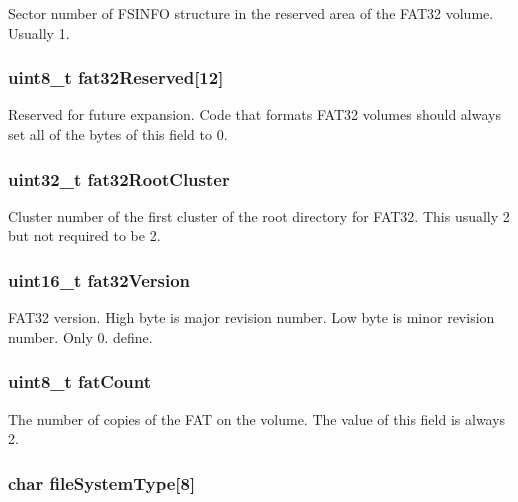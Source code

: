 Sector number of F\-S\-I\-N\-F\-O structure in the reserved area of the F\-A\-T32 volume. Usually 1. \hypertarget{structfat32__boot_ae31dc7ad96aec8e0d184fd7e5a97f30d}{
\subsubsection[{fat32\-Reserved}]{\setlength{\rightskip}{0pt plus 5cm}uint8\-\_\-t fat32\-Reserved\mbox{[}12\mbox{]}}}\label{structfat32__boot_ae31dc7ad96aec8e0d184fd7e5a97f30d}
Reserved for future expansion. Code that formats F\-A\-T32 volumes should always set all of the bytes of this field to 0. \hypertarget{structfat32__boot_a58249ed4ed0f92d5768f2342f248af82}{
\subsubsection[{fat32\-Root\-Cluster}]{\setlength{\rightskip}{0pt plus 5cm}uint32\-\_\-t fat32\-Root\-Cluster}}\label{structfat32__boot_a58249ed4ed0f92d5768f2342f248af82}
Cluster number of the first cluster of the root directory for F\-A\-T32. This usually 2 but not required to be 2. \hypertarget{structfat32__boot_a8f27235fa3dee48a4b4e099135fc81d6}{
\subsubsection[{fat32\-Version}]{\setlength{\rightskip}{0pt plus 5cm}uint16\-\_\-t fat32\-Version}}\label{structfat32__boot_a8f27235fa3dee48a4b4e099135fc81d6}
F\-A\-T32 version. High byte is major revision number. Low byte is minor revision number. Only 0. define. \hypertarget{structfat32__boot_a624e9eb125b4fc8aeaebcccf79e17aa8}{
\subsubsection[{fat\-Count}]{\setlength{\rightskip}{0pt plus 5cm}uint8\-\_\-t fat\-Count}}\label{structfat32__boot_a624e9eb125b4fc8aeaebcccf79e17aa8}
The number of copies of the F\-A\-T on the volume. The value of this field is always 2. \hypertarget{structfat32__boot_adf80bb044ef7c8ac6d371268aa338e23}{
\subsubsection[{file\-System\-Type}]{\setlength{\rightskip}{0pt plus 5cm}char file\-System\-Type\mbox{[}8\mbox{]}}}\label{structfat32__boot_adf80bb044ef7c8ac6d371268aa338e23}
